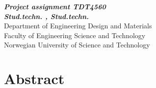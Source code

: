 \begin{center}
{\Large\bfseries \mytitle}
\end{center}

\begin{center}
{\bfseries\slshape Project assignment TDT4560}
\\[1.0cm]
{\bfseries\slshape
Stud.techn. \myauthorA, Stud.techn. \myauthorB \\}
Department of Engineering Design and Materials \\
Faculty of Engineering Science and Technology\\
Norwegian University of Science and Technology
\end{center}
\section*{Abstract}





